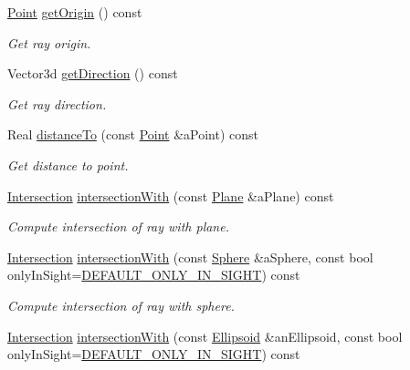 \begin{DoxyCompactItemize}
\hyperlink{classostk_1_1math_1_1geom_1_1d3_1_1objects_1_1_point}{Point} \hyperlink{classostk_1_1math_1_1geom_1_1d3_1_1objects_1_1_ray_a8c47fac4d487986b538b8168484527c2}{get\+Origin} () const
\begin{DoxyCompactList}\small\item\em Get ray origin. \end{DoxyCompactList}\item 
Vector3d \hyperlink{classostk_1_1math_1_1geom_1_1d3_1_1objects_1_1_ray_a986aa3d13740b411f72115503b1c9a72}{get\+Direction} () const
\begin{DoxyCompactList}\small\item\em Get ray direction. \end{DoxyCompactList}\item 
Real \hyperlink{classostk_1_1math_1_1geom_1_1d3_1_1objects_1_1_ray_a9c7b98506891aac4fa9f3d20939fcf67}{distance\+To} (const \hyperlink{classostk_1_1math_1_1geom_1_1d3_1_1objects_1_1_point}{Point} \&a\+Point) const
\begin{DoxyCompactList}\small\item\em Get distance to point. \end{DoxyCompactList}\item 
\hyperlink{classostk_1_1math_1_1geom_1_1d3_1_1_intersection}{Intersection} \hyperlink{classostk_1_1math_1_1geom_1_1d3_1_1objects_1_1_ray_aa4625c2dfe200ab9df245d2a4dc92f64}{intersection\+With} (const \hyperlink{classostk_1_1math_1_1geom_1_1d3_1_1objects_1_1_plane}{Plane} \&a\+Plane) const
\begin{DoxyCompactList}\small\item\em Compute intersection of ray with plane. \end{DoxyCompactList}\item 
\hyperlink{classostk_1_1math_1_1geom_1_1d3_1_1_intersection}{Intersection} \hyperlink{classostk_1_1math_1_1geom_1_1d3_1_1objects_1_1_ray_ad51ec740a903fc78304898a08d28103b}{intersection\+With} (const \hyperlink{classostk_1_1math_1_1geom_1_1d3_1_1objects_1_1_sphere}{Sphere} \&a\+Sphere, const bool only\+In\+Sight=\hyperlink{_sphere_8hpp_af424617f7c785f4835e2feba5a5640f2}{D\+E\+F\+A\+U\+L\+T\+\_\+\+O\+N\+L\+Y\+\_\+\+I\+N\+\_\+\+S\+I\+G\+HT}) const
\begin{DoxyCompactList}\small\item\em Compute intersection of ray with sphere. \end{DoxyCompactList}\item 
\hyperlink{classostk_1_1math_1_1geom_1_1d3_1_1_intersection}{Intersection} \hyperlink{classostk_1_1math_1_1geom_1_1d3_1_1objects_1_1_ray_abc3d3b69f26e6a43e9b10b55e0fc8a45}{intersection\+With} (const \hyperlink{classostk_1_1math_1_1geom_1_1d3_1_1objects_1_1_ellipsoid}{Ellipsoid} \&an\+Ellipsoid, const bool only\+In\+Sight=\hyperlink{_sphere_8hpp_af424617f7c785f4835e2feba5a5640f2}{D\+E\+F\+A\+U\+L\+T\+\_\+\+O\+N\+L\+Y\+\_\+\+I\+N\+\_\+\+S\+I\+G\+HT}) const

\end{DoxyCompactItemize}
